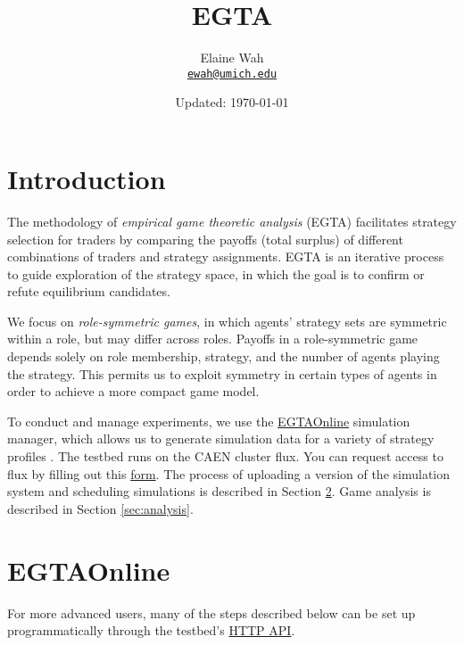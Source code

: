 \documentclass[11pt]{article}
\newcommand{\email}[1]{\href{mailto:#1}{\texttt{#1}}}
\begin{document}
	
\title{EGTA}
\author{
  Elaine Wah \\
  \email{ewah@umich.edu}
}
\date{Updated: \today}
\maketitle

\section{Introduction}

The methodology of \emph{empirical game theoretic analysis} (EGTA) \citep{Wellman2006} facilitates strategy selection for traders by comparing the payoffs (total surplus) of different combinations of traders and strategy assignments. EGTA is an iterative process to guide exploration of the strategy space, in which the goal is to confirm or refute equilibrium candidates.

We focus on \emph{role-symmetric games}, in which agents' strategy sets are symmetric within a role, but may differ across roles.
Payoffs in a role-symmetric game depends solely on role membership, strategy, and the number of agents playing the strategy. This permits us to exploit symmetry in certain types of agents in order to achieve a more compact game model.

To conduct and manage experiments, we use the \href{http://egtaonline.eecs.umich.edu}{EGTAOnline} simulation manager, which allows us to generate simulation data for a variety of strategy profiles \citep{Cassell2013}.
The testbed runs on the CAEN cluster flux. You can request access to flux by filling out this \href{https://docs.google.com/a/umich.edu/forms/d/1u9hdqdinnNC9iF6If2xV0C06knbP_TKJBIzfCSnWw6I/viewform}{form}.
The process of uploading a version of the simulation system and scheduling simulations is described in Section \ref{sec:egta}.
Game analysis is described in Section \ref{sec:analysis}.

\section{EGTAOnline}
\label{sec:egta}

For more advanced users, many of the steps described below can be set up programmatically through the testbed's \href{https://github.com/bcassell/egtaonline3/wiki/API}{HTTP API}.
\end{document}
